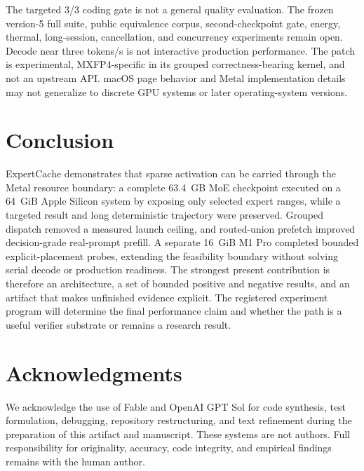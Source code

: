 \documentclass[10pt,twocolumn]{article}
\newcommand{\system}{ExpertCache}
\begin{document}
The targeted 3/3 coding gate is not a general quality evaluation.  The frozen
version-5 full suite, public equivalence corpus, second-checkpoint gate,
energy, thermal,
long-session, cancellation, and concurrency experiments remain open.  Decode
near three tokens/s is not interactive production performance.  The patch is
experimental, MXFP4-specific in its grouped correctness-bearing kernel, and
not an upstream API.  macOS page behavior and Metal implementation details may
not generalize to discrete GPU systems or later operating-system versions.

\section{Conclusion}

\system{} demonstrates that sparse activation can be carried through the
Metal resource boundary: a complete 63.4~GB MoE checkpoint executed on a
64~GiB Apple Silicon system by exposing only selected expert ranges, while a
targeted result and long deterministic trajectory were preserved.  Grouped
dispatch removed a measured launch ceiling, and routed-union prefetch improved
decision-grade real-prompt prefill.  A separate 16~GiB M1 Pro completed bounded
explicit-placement probes, extending the feasibility boundary without solving
serial decode or production readiness.  The strongest present contribution is
therefore an
architecture, a set of bounded positive and negative results, and an artifact
that makes unfinished evidence explicit.  The registered experiment program
will determine the final performance claim and whether the path is a useful
verifier substrate or remains a research result.

\section{Acknowledgments}

We acknowledge the use of Fable and OpenAI GPT Sol for code synthesis, test
formulation, debugging, repository restructuring, and text refinement during
the preparation of this artifact and manuscript.  These systems are not
authors.  Full responsibility for originality, accuracy, code integrity, and
empirical findings remains with the human author.



\end{document}

